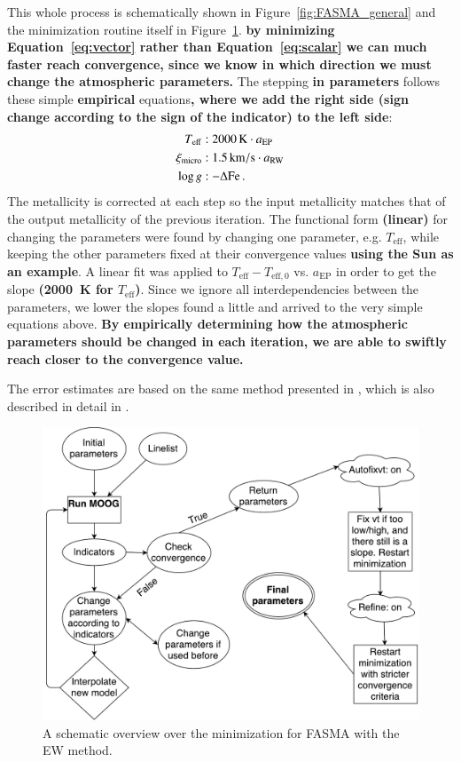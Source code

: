 \documentclass{aa}
\begin{document}
This whole process is schematically shown in Figure~\ref{fig:FASMA_general} and
the minimization routine itself in Figure~\ref{fig:FASMA_minimization}. {\bf by
minimizing Equation~\ref{eq:vector} rather than Equation~\ref{eq:scalar} we can
much faster reach convergence, since we know in which direction we must change
the atmospheric parameters.} The stepping {\bf in parameters} follows these
simple {\bf empirical} equations{\bf, where we add the right side (sign change
according to the sign of the indicator) to the left side}:
\begin{align}
    T_\mathrm{eff}     &: \SI{2000}{K} \cdot a_\mathrm{EP}   \\
    \xi_\mathrm{micro} &: \SI{1.5}{km/s} \cdot a_\mathrm{RW} \\
    \log g             &: -\Delta\ion{Fe}.
\end{align}
The metallicity is corrected at each step so the input metallicity matches that
of the output metallicity of the previous iteration. The functional form {\bf
(linear)} for changing the parameters were found by changing one parameter, e.g.
$T_\mathrm{eff}$, while keeping the other parameters fixed at their convergence
values {\bf using the Sun as an example}. A linear fit was applied to
$T_\mathrm{eff} - T_\mathrm{eff,0}$ vs. $a_\mathrm{EP}$ in order to get the
slope {\bf (\SI{2000}{K} for $T_\mathrm{eff}$)}. Since we ignore all
interdependencies between the parameters, we lower the slopes found a little and
arrived to the very simple equations above. {\bf By empirically determining how
the atmospheric parameters should be changed in each iteration, we are able to
swiftly reach closer to the convergence value.}

The error estimates are based on the same method presented in
\citet{Gonzalez2000}, which is also described in detail in
\citet{Santos2003,Andreasen2016}.

\begin{figure}[tpb]
    \centering
    \includegraphics[width=1.0\linewidth,natwidth=700,natheight=650]{figures/FASMA_minimization.pdf}
    \caption{A schematic overview over the minimization for FASMA with the
    EW method.}
    \label{fig:FASMA_minimization}
\end{figure}
\end{document}
